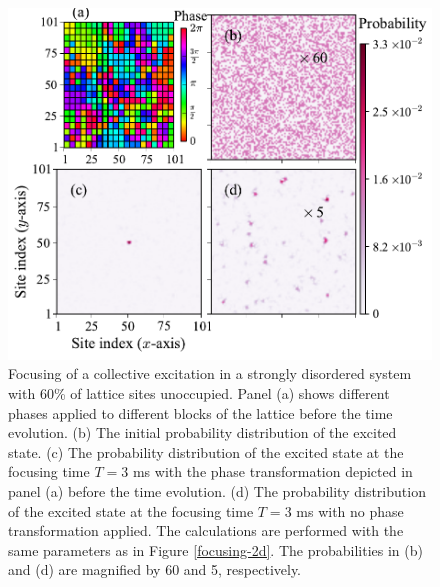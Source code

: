 \begin{figure}[htbp]
\centering
\includegraphics[width=\linewidth]{t-matrix-focusing.pdf}
\caption{  Focusing of a collective excitation in a strongly disordered system with 60\% of lattice sites unoccupied.  Panel (a) shows different phases applied to
different blocks of the lattice before the time evolution.
(b) The initial probability distribution of the excited state. (c) The probability distribution of the excited state at the
focusing time $T = 3$ ms with the phase transformation depicted in panel (a) before the time
evolution. (d) The probability distribution of the excited state at the focusing time $T = 3$ ms with no phase transformation
applied. The calculations are performed
with the same parameters as in Figure \ref{focusing-2d}. The
probabilities in (b) and (d) are magnified by 60 and 5,
respectively. } \label{t-matrix-focusing}
\end{figure}

